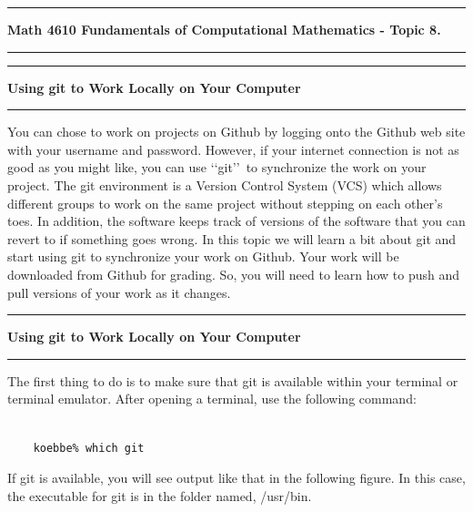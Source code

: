 \documentclass[10pt,fleqn]{article}
\begin{document}
\vskip0.1in\hrule\vskip0.1in \noindent
{\bf Math 4610 Fundamentals of Computational Mathematics  - Topic 8.}
\vskip0.1in\hrule\vskip0.1in \noindent
\vskip0.1in\hrule\vskip0.1in\noindent\noindent
{\bf Using git to Work Locally on Your Computer} 
\vskip0.1in\hrule\vskip0.1in\noindent
You can chose to work on projects on Github by logging onto the Github web site
with your username and password. However, if your internet connection is not as
good as you might like, you can use \lq\lq git\rq\rq\ to synchronize the work
on your project. The git environment is a Version Control System (VCS) which
allows different groups to work on the same project without stepping on each
other's toes. In addition, the software keeps track of versions of the software
that you can revert to if something goes wrong. In this topic we will learn a
bit about git and start using git to synchronize your work on Github. Your work
will be downloaded from Github for grading. So, you will need to learn how to
push and pull versions of your work as it changes.
\vskip0.1in\hrule\vskip0.1in\noindent\noindent
{\bf Using git to Work Locally on Your Computer} 
\vskip0.1in\hrule\vskip0.1in\noindent
The first thing to do is to make sure that git is available within your terminal
or terminal emulator. After opening a terminal, use the following command:
\begin{verbatim}

    koebbe% which git

\end{verbatim}
If git is available, you will see output like that in the following figure. In
this case, the executable for git is in the folder named, /usr/bin.
\end{document}
